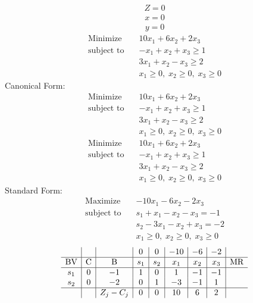 \documentclass{article}
\begin{document}
\begin{align*}
Z=0\end{align*}
\begin{align*}
x=0\end{align*}
\begin{align*}
y=0\end{align*}
\begin{align*}
\text{Minimize} \quad & 10x_{1} + 6x_{2} + 2x_{3}\\
\text{subject to} \quad
& -x_{1} + x_{2} + x_{3}\ge1\\
& 3x_{1} + x_{2} - x_{3}\ge2\\
& x_{1}\ge0,\; x_{2}\ge0,\; x_{3}\ge0\end{align*}
Canonical Form:\\
\begin{align*}
\text{Minimize} \quad & 10x_{1} + 6x_{2} + 2x_{3}\\
\text{subject to} \quad
& -x_{1} + x_{2} + x_{3}\ge1\\
& 3x_{1} + x_{2} - x_{3}\ge2\\
& x_{1}\ge0,\; x_{2}\ge0,\; x_{3}\ge0\end{align*}
\begin{align*}
\text{Minimize} \quad & 10x_{1} + 6x_{2} + 2x_{3}\\
\text{subject to} \quad
& -x_{1} + x_{2} + x_{3}\ge1\\
& 3x_{1} + x_{2} - x_{3}\ge2\\
& x_{1}\ge0,\; x_{2}\ge0,\; x_{3}\ge0\end{align*}
Standard Form:\\
\begin{align*}
\text{Maximize} \quad & -10x_{1} - 6x_{2} - 2x_{3}\\
\text{subject to} \quad
& s_{1} + x_{1} - x_{2} - x_{3}=-1\\
& s_{2} - 3x_{1} - x_{2} + x_{3}=-2\\
& x_{1}\ge0,\; x_{2}\ge0,\; x_{3}\ge0\end{align*}
\begin{align*}
\begin{array}{c|c|c|c|c|c|c|c|c}
 &  &  & 0 & 0 & -10 & -6 & -2 & \\
\hline
\text{BV} & \text{C} & \text{B} & s_{1} & s_{2} & x_{1} & x_{2} & x_{3} & \text{MR} \\
\hline
s_{1} & 0 & -1 & 1 & 0 & 1 & -1 & -1 \\
s_{2} & 0 & -2 & 0 & 1 & -3 & -1 & 1 \\
\hline
 &  & Z_j-C_j & 0 & 0 & 10 & 6 & 2 & \\
\end{array}
\end{align*}
\end{document}
